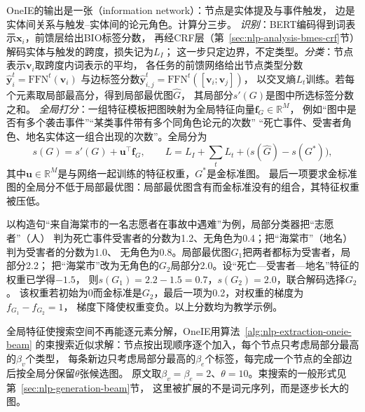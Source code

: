 OneIE的输出是一张（information network）：节点是实体提及与事件触发，
边是实体间关系与触发--实体间的论元角色。计算分三步。
\emph{识别}：BERT编码得到词表示$\bm{x}_i$，前馈层给出BIO标签分数，
再经CRF层（第~\ref{sec:nlp-analysis-bmes-crf}节）解码实体与触发的跨度，损失记为$L_I$；
这一步只定边界，不定类型。\emph{分类}：节点表示$\bm{v}_i$取跨度内词表示的平均，
各任务的前馈网络给出节点类型分数$\hat{\bm{y}}^{t}_i=\mathrm{FFN}^t(\bm{v}_i)$
与边标签分数$\hat{\bm{y}}^{t}_{i,j}=\mathrm{FFN}^t([\bm{v}_i;\bm{v}_j])$，
以交叉熵$L_t$训练。若每个元素取局部最高分，得到局部最优图$\hat{G}$，
其局部分$s'(G)$是图中所选标签分数之和。
\emph{全局打分}：一组特征模板把图映射为全局特征向量$\bm{f}_G\in\mathbb{R}^{M}$，
例如“图中是否有多个袭击事件”“某类事件带有多个同角色论元的次数”
“死亡事件、受害者角色、地名实体这一组合出现的次数”。全局分为
\begin{equation}
  s(G)=s'(G)+\bm{u}^{\top}\bm{f}_G,
  \qquad
  L=L_I+\sum_{t}L_t+\bigl(s(\hat{G})-s(G^{*})\bigr),
  \label{eq:nlp-extraction-oneie-score}
\end{equation}
其中$\bm{u}\in\mathbb{R}^{M}$是与网络一起训练的特征权重，$G^{*}$是金标准图。
最后一项要求金标准图的全局分不低于局部最优图：局部最优图含有而金标准没有的组合，其特征权重被压低。

以构造句“来自海棠市的一名志愿者在事故中遇难”为例，局部分类器把“志愿者”（人）
判为死亡事件受害者的分数为1.2、无角色为0.4；把“海棠市”（地名）判为受害者的分数为1.0、
无角色为0.8。局部最优图$G_1$把两者都标为受害者，局部分2.2；
把“海棠市”改为无角色的$G_2$局部分2.0。设“死亡—受害者—地名”特征的权重已学得$-1.5$，
则$s(G_1)=2.2-1.5=0.7$，$s(G_2)=2.0$，联合解码选择$G_2$。
该权重若初始为0而金标准是$G_2$，最后一项为0.2，对权重的梯度为$f_{G_1}-f_{G_2}=1$，
梯度下降使权重变负。以上分数均为教学示例。

全局特征使搜索空间不再能逐元素分解，OneIE用算法~\ref{alg:nlp-extraction-oneie-beam}
的束搜索近似求解：节点按出现顺序逐个加入，每个节点只考虑局部分最高的$\beta_v$个类型，
每条新边只考虑局部分最高的$\beta_e$个标签，每完成一个节点的全部边后按全局分保留$\theta$张候选图。
原文取$\beta_v=\beta_e=2$、$\theta=10$。束搜索的一般形式见第~\ref{sec:nlp-generation-beam}节，
这里被扩展的不是词元序列，而是逐步长大的图。

